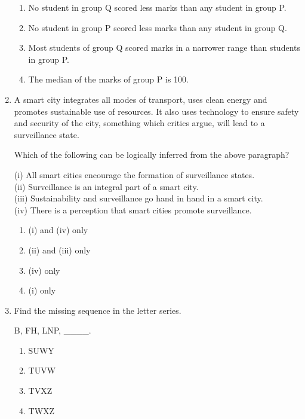 \documentclass[journal,12pt,onecolumn]{IEEEtran}
\begin{document}
\begin{enumerate}
\hfill{}


\begin{enumerate}
\item No student in group Q scored less marks than any student in group P.
\item No student in group P scored less marks than any student in group Q.
\item Most students of group Q scored marks in a narrower range than students in group P.
\item The median of the marks of group P is 100.
\end{enumerate}




\item A smart city integrates all modes of transport, uses clean energy and promotes sustainable use of resources. It also uses technology to ensure safety and security of the city, something which critics argue, will lead to a surveillance state.

Which of the following can be logically inferred from the above paragraph?

(i) All smart cities encourage the formation of surveillance states. \\
(ii) Surveillance is an integral part of a smart city. \\
(iii) Sustainability and surveillance go hand in hand in a smart city. \\
(iv) There is a perception that smart cities promote surveillance.

\hfill{}

\begin{multicols}{2}
\begin{enumerate}
\item (i) and (iv) only
\item (ii) and (iii) only
\item (iv) only
\item (i) only
\end{enumerate}
\end{multicols}

\item Find the missing sequence in the letter series.

B, FH, LNP, \_\_\_\_.

\hfill{}

\begin{multicols}{4}
\begin{enumerate}
\item SUWY
\item TUVW
\item TVXZ
\item TWXZ
\end{enumerate}
\end{multicols}


\end{enumerate}
\end{document}
